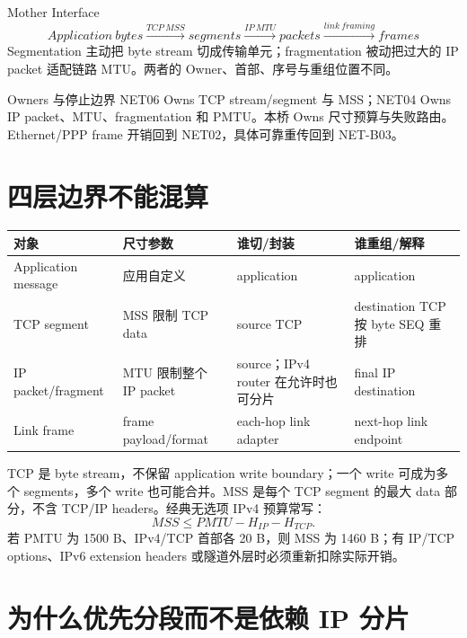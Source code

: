 \documentclass[UTF8,fontset=none,11pt,a4paper]{ctexart}
\begin{document}

\begin{corebox}{Mother Interface}
\[
\boxed{Application\ bytes\xrightarrow{TCP\ MSS}segments
\xrightarrow{IP\ MTU}packets\xrightarrow{link\ framing}frames}
\]
Segmentation 主动把 byte stream 切成传输单元；fragmentation 被动把过大的 IP packet 适配链路 MTU。两者的 Owner、首部、序号与重组位置不同。
\end{corebox}

\begin{methodbox}{Owners 与停止边界}
NET06 Owns TCP stream/segment 与 MSS；NET04 Owns IP packet、MTU、fragmentation 和 PMTU。本桥 Owns 尺寸预算与失败路由。Ethernet/PPP frame 开销回到 NET02，具体可靠重传回到 NET-B03。
\end{methodbox}

\section{四层边界不能混算}

\begin{center}\small
\begin{tabularx}{\linewidth}{L{2.2cm}Y Y Y}
\toprule
对象 & 尺寸参数 & 谁切/封装 & 谁重组/解释\\
\midrule
Application message & 应用自定义 & application & application\\
TCP segment & MSS 限制 TCP data & source TCP & destination TCP 按 byte SEQ 重排\\
IP packet/fragment & MTU 限制整个 IP packet & source；IPv4 router 在允许时也可分片 & final IP destination\\
Link frame & frame payload/format & each-hop link adapter & next-hop link endpoint\\
\bottomrule
\end{tabularx}
\end{center}

TCP 是 byte stream，不保留 application write boundary；一个 write 可成为多个 segments，多个 write 也可能合并。MSS 是每个 TCP segment 的最大 data 部分，不含 TCP/IP headers。经典无选项 IPv4 预算常写：
\[
MSS\le PMTU-H_{IP}-H_{TCP}.
\]
若 PMTU 为 1500 B、IPv4/TCP 首部各 20 B，则 MSS 为 1460 B；有 IP/TCP options、IPv6 extension headers 或隧道外层时必须重新扣除实际开销。

\section{为什么优先分段而不是依赖 IP 分片}
\end{document}
